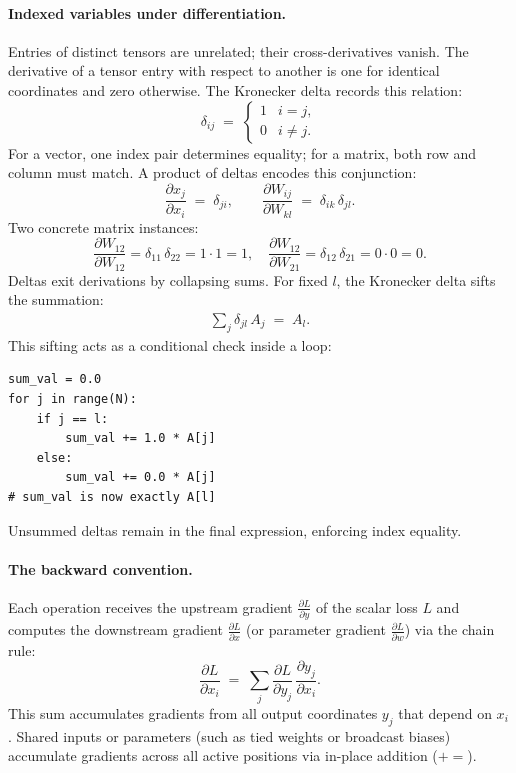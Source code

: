 \documentclass[letterpaper, 10 pt, conference]{ieeeconf}
\newcommand{\pdv}[2]{\frac{\partial #1}{\partial #2}}
\newcommand{\dL}[1]{\pdv{L}{#1}}
\newcommand{\kron}[2]{\delta_{#1 #2}}
\theoremstyle{definition}
\begin{document}
\paragraph{Indexed variables under differentiation.}
Entries of distinct tensors are unrelated; their cross-derivatives vanish. The derivative of a tensor entry with respect to another is one for identical coordinates and zero otherwise. The Kronecker delta records this relation:
\begin{equation}
  \kron{i}{j} \;=\;
  \begin{cases}
    1 & i = j,    \\
    0 & i \neq j.
  \end{cases}
  \label{eq:kron}
\end{equation}
For a vector, one index pair determines equality; for a matrix, both row and column must match. A product of deltas encodes this conjunction:
\begin{equation}
  \pdv{x_j}{x_i} \;=\; \kron{j}{i},
  \qquad
  \pdv{W_{ij}}{W_{kl}} \;=\; \kron{i}{k}\,\kron{j}{l}.
  \label{eq:entry-dv}
\end{equation}
Two concrete matrix instances:
\begin{equation}
  \pdv{W_{12}}{W_{12}} = \kron{1}{1}\,\kron{2}{2} = 1 \cdot 1 = 1,
  \quad
  \pdv{W_{12}}{W_{21}} = \kron{1}{2}\,\kron{2}{1} = 0 \cdot 0 = 0.
  \label{eq:entry-dv-example}
\end{equation}
Deltas exit derivations by collapsing sums. For fixed $l$, the Kronecker delta sifts the summation:
\begin{align}
  \sum_{j} \kron{j}{l}\,A_j \;=\; A_l.
  \label{eq:sift}
\end{align}
This sifting acts as a conditional check inside a loop:
\begin{verbatim}
sum_val = 0.0
for j in range(N):
    if j == l:
        sum_val += 1.0 * A[j]
    else:
        sum_val += 0.0 * A[j]
# sum_val is now exactly A[l]
\end{verbatim}
Unsummed deltas remain in the final expression, enforcing index equality.

\paragraph{The backward convention.}
Each operation receives the upstream gradient $\dL{y}$ of the scalar loss $L$ and computes the downstream gradient $\dL{x}$ (or parameter gradient $\dL{w}$) via the chain rule:
\begin{equation}
  \dL{x_i} \;=\; \sum_j \dL{y_j}\,\pdv{y_j}{x_i}.
  \label{eq:chain}
\end{equation}
This sum accumulates gradients from all output coordinates $y_j$ that depend on $x_i$. Shared inputs or parameters (such as tied weights or broadcast biases) accumulate gradients across all active positions via in-place addition ($\mathrel{+}=$).
\end{document}
